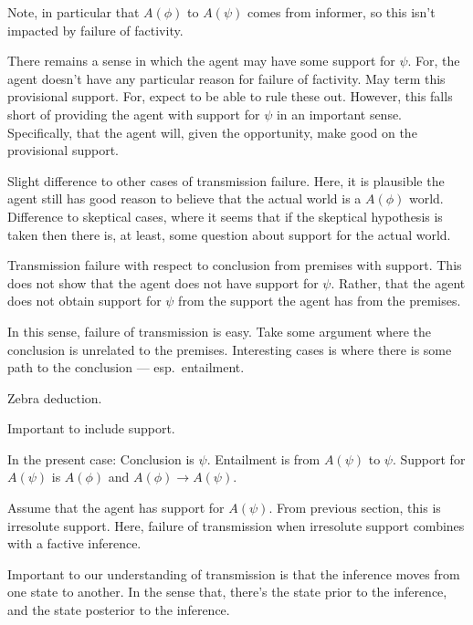 \documentclass[10pt]{article}
\begin{document}
\begin{note}
  Note, in particular that \(A(\phi)\) to \(A(\psi)\) comes from informer, so this isn't impacted by failure of factivity.

  There remains a sense in which the agent may have some support for \(\psi\).
  For, the agent doesn't have any particular reason for failure of factivity.
  May term this provisional support.
  For, expect to be able to rule these out.
  However, this falls short of providing the agent with support for \(\psi\) in an important sense.
  Specifically, that the agent will, given the opportunity, make good on the provisional support.

  Slight difference to other cases of transmission failure.
  Here, it is plausible the agent still has good reason to believe that the actual world is a \(A(\phi)\) world.
  Difference to skeptical cases, where it seems that if the skeptical hypothesis is taken then there is, at least, some question about support for the actual world.
\end{note}

\begin{note}
  Transmission failure with respect to conclusion from premises with support.
  This does not show that the agent does not have support for \(\psi\).
  Rather, that the agent does not obtain support for \(\psi\) from the support the agent has from the premises.

  In this sense, failure of transmission is easy.
  Take some argument where the conclusion is unrelated to the premises.
  Interesting cases is where there is some path to the conclusion --- esp.\ entailment.

  Zebra deduction.

  Important to include support.

  In the present case:
  Conclusion is \(\psi\).
  Entailment is from \(A(\psi)\) to \(\psi\).
  Support for \(A(\psi)\) is \(A(\phi)\) and \(A(\phi) \rightarrow A(\psi)\).

  Assume that the agent has support for \(A(\psi)\).
  From previous section, this is irresolute support.
  Here, failure of transmission when irresolute support combines with a factive inference.

  Important to our understanding of transmission is that the inference moves from one state to another.
  In the sense that, there's the state prior to the inference, and the state posterior to the inference.
\end{note}
\end{document}
